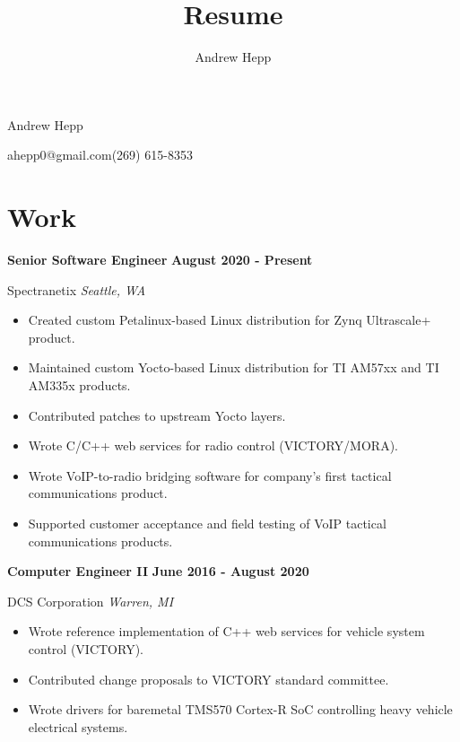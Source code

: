 \documentclass{article}
\title{Resume}
\author{Andrew Hepp}
\newcommand{\experience}[4]{
    \noindent \textbf{#1} \hfill \textbf{#2} \par
    \noindent #3 \hfill \textit{#4} \par
}
\begin{document}
    \begin{center}
       \Huge Andrew Hepp \normalsize
    \end{center}
    ahepp0@gmail.com\hfill(269) 615-8353

    \section*{Work}
        \experience{Senior Software Engineer}{August 2020 - Present}{Spectranetix}{Seattle, WA}
        \begin{itemize}
            \item Created custom Petalinux-based Linux distribution for Zynq Ultrascale+ product.
            \item Maintained custom Yocto-based Linux distribution for TI AM57xx and TI AM335x products.
            \item Contributed patches to upstream Yocto layers.
            \item Wrote C/C++ web services for radio control (VICTORY/MORA).
            \item Wrote VoIP-to-radio bridging software for company's first tactical communications product.
            \item Supported customer acceptance and field testing of VoIP tactical communications products.
        \end{itemize}

        \experience{Computer Engineer II}{June 2016 - August 2020}{DCS Corporation}{Warren, MI}
        \begin{itemize}
            \item Wrote reference implementation of C++ web services for vehicle system control (VICTORY).
            \item Contributed change proposals to VICTORY standard committee.
            \item Wrote drivers for baremetal TMS570 Cortex-R SoC controlling heavy vehicle electrical systems.
        \end{itemize}
\end{document}
